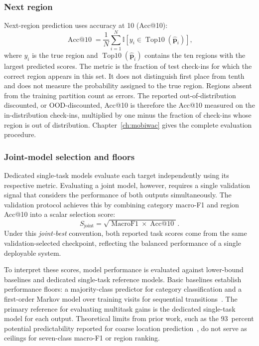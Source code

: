 \subsubsection{Next region}

Next-region prediction uses accuracy at 10 (Acc@10):
\begin{equation}\label{eq:fund:acc10}
    \operatorname{Acc@10} = \frac{1}{N}\sum_{i=1}^{N}
    \mathbb{I}\!\left[y_i \in \operatorname{Top10}(\hat{\mathbf{p}}_i)\right],
\end{equation}
where $y_i$ is the true region and $\operatorname{Top10}(\hat{\mathbf{p}}_i)$ contains
the ten regions with the largest predicted scores. The metric is the fraction of test
check-ins for which the correct region appears in this set. It does not distinguish
first place from tenth and does not measure the probability assigned to the true
region. Regions absent from the training partition count as errors. The reported
out-of-distribution discounted, or OOD-discounted, Acc@10 is therefore the Acc@10
measured on the in-distribution check-ins, multiplied by one minus the fraction of
check-ins whose region is out of distribution. Chapter~\ref{ch:mobiwac} gives the
complete evaluation procedure.

\subsubsection{Joint-model selection and floors}

Dedicated single-task models evaluate each target independently using its respective
metric. Evaluating a joint model, however, requires a single validation signal that
considers the performance of both outputs simultaneously. The validation protocol
achieves this by combining category macro-F1 and region Acc@10 into a scalar
selection score:
\begin{equation}\label{eq:fund:joint-selection}
    S_{\mathrm{joint}} = \sqrt{\operatorname{MacroF1} \times \operatorname{Acc@10}}.
\end{equation}
Under this \emph{joint-best} convention, both reported task scores come from the same
validation-selected checkpoint, reflecting the balanced performance of a single
deployable system.

To interpret these scores, model performance is evaluated against lower-bound
baselines and dedicated single-task reference models. Basic baselines establish
performance floors: a majority-class predictor for category classification and a
first-order Markov model over training visits for sequential
transitions~\cite{gambs2012mmc}. The primary reference for evaluating multitask gains
is the dedicated single-task model for each output.
Theoretical limits from prior work, such as the 93~percent potential predictability
reported for coarse location prediction~\cite{song2010limits}, do not serve as
ceilings for seven-class macro-F1 or region ranking.



